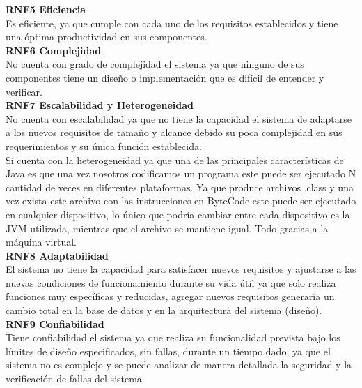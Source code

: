 \textbf{RNF5 \hspace{2cm}Eficiencia}\\
Es eficiente, ya que cumple con cada uno de los requisitos establecidos y tiene una óptima productividad en sus componentes. \\

\textbf{RNF6 \hspace{2cm}Complejidad}\\
No cuenta con grado de complejidad el sistema ya que ninguno de sus componentes tiene un diseño o implementación que es difícil de entender y verificar. \\


\textbf{RNF7 \hspace{2cm}Escalabilidad y Heterogeneidad}\\
No cuenta con escalabilidad ya que no tiene la capacidad el sistema de adaptarse a los nuevos requisitos de tamaño y alcance debido su poca complejidad en sus requerimientos y su única función establecida. \\
Si cuenta con la heterogeneidad ya que una de las principales características de Java es que una vez nosotros codificamos un programa este puede ser ejecutado N cantidad de veces en diferentes plataformas. Ya que produce archivos .class y una vez exista este archivo con las instrucciones en ByteCode este puede ser ejecutado en cualquier dispositivo, lo único que podría cambiar entre cada dispositivo es la JVM utilizada, mientras que el archivo se mantiene igual. Todo gracias a la máquina virtual.\\


\textbf{RNF8 \hspace{2cm}Adaptabilidad}\\
El sistema no tiene la capacidad para satisfacer nuevos requisitos y ajustarse a las nuevas condiciones de funcionamiento durante su vida útil ya que solo realiza funciones muy específicas y reducidas, agregar nuevos requisitos generaría un cambio total en la base de datos y en la arquitectura del sistema (diseño).\\


\textbf{RNF9 \hspace{2cm}Confiabilidad}\\
Tiene confiabilidad el sistema ya que realiza su funcionalidad prevista bajo los límites de diseño especificados, sin fallas, durante un tiempo dado, ya que el sistema no es complejo y se puede analizar de manera detallada la seguridad y la verificación de fallas del sistema.\\

